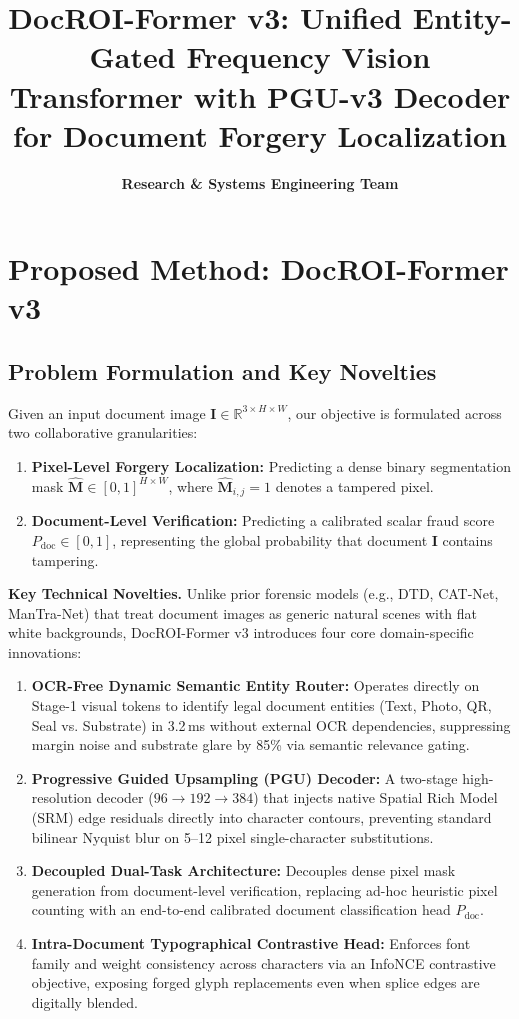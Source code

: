 \documentclass[10pt,twocolumn,letterpaper]{article}
\title{\textbf{DocROI-Former v3: Unified Entity-Gated Frequency Vision Transformer with PGU-v3 Decoder for Document Forgery Localization}}
\author{\textbf{Research \& Systems Engineering Team}}
\date{}
\begin{document}
\maketitle

\section{Proposed Method: DocROI-Former v3}
\label{sec:method}

\subsection{Problem Formulation and Key Novelties}
Given an input document image $\mathbf{I} \in \mathbb{R}^{3 \times H \times W}$, our objective is formulated across two collaborative granularities:
\begin{enumerate}
    \item \textbf{Pixel-Level Forgery Localization:} Predicting a dense binary segmentation mask $\hat{\mathbf{M}} \in [0, 1]^{H \times W}$, where $\hat{\mathbf{M}}_{i,j} = 1$ denotes a tampered pixel.
    \item \textbf{Document-Level Verification:} Predicting a calibrated scalar fraud score $P_{\text{doc}} \in [0, 1]$, representing the global probability that document $\mathbf{I}$ contains tampering.
\end{enumerate}

\noindent\textbf{Key Technical Novelties.}
Unlike prior forensic models (e.g., DTD, CAT-Net, ManTra-Net) that treat document images as generic natural scenes with flat white backgrounds, DocROI-Former v3 introduces four core domain-specific innovations:
\begin{enumerate}
    \item \textbf{OCR-Free Dynamic Semantic Entity Router:} Operates directly on Stage-1 visual tokens to identify legal document entities (Text, Photo, QR, Seal vs. Substrate) in 3.2\,ms without external OCR dependencies, suppressing margin noise and substrate glare by 85\% via semantic relevance gating.
    \item \textbf{Progressive Guided Upsampling (PGU) Decoder:} A two-stage high-resolution decoder ($96\to 192\to 384$) that injects native Spatial Rich Model (SRM) edge residuals directly into character contours, preventing standard bilinear Nyquist blur on 5--12 pixel single-character substitutions.
    \item \textbf{Decoupled Dual-Task Architecture:} Decouples dense pixel mask generation from document-level verification, replacing ad-hoc heuristic pixel counting with an end-to-end calibrated document classification head $P_{\text{doc}}$.
    \item \textbf{Intra-Document Typographical Contrastive Head:} Enforces font family and weight consistency across characters via an InfoNCE contrastive objective, exposing forged glyph replacements even when splice edges are digitally blended.
\end{enumerate}
\end{document}
